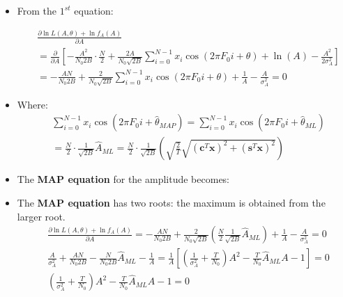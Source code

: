\begin{itemize}
\item From the \(1^{st}\) equation:

\begin{align*}
& \frac{\partial \ln L(A, \theta) + \ln f_A(A)}{\partial A} \\[5pt]
&= \frac{\partial}{\partial A} \left[ - \frac{A^2}{N_0 2B} \cdot \frac{N}{2} + \frac{2A}{N_0 \sqrt{2B}} \sum_{i=0}^{N-1} x_i \cos(2\pi F_0 i + \theta) + \ln(A) - \frac{A^2}{2\sigma_A^2} \right] \\[5pt]
&= - \frac{AN}{N_0 2B} + \frac{2}{N_0 \sqrt{2B}} \sum_{i=0}^{N-1} x_i \cos(2\pi F_0 i + \theta) + \frac{1}{A} - \frac{A}{\sigma_A^2} = 0
\end{align*}
\item Where:
\begin{align*}
&\sum_{i=0}^{N-1} x_i \cos \left( 2\pi F_0 i + \hat{\theta}_{MAP} \right) = \sum_{i=0}^{N-1} x_i \cos \left( 2\pi F_0 i + \hat{\theta}_{ML} \right) \\[5pt]
&= \frac{N}{2} \cdot \frac{1}{\sqrt{2B}} \hat{A}_{ML} = \frac{N}{2} \cdot \frac{1}{\sqrt{2B}} \left( \sqrt{\frac{2}{T}} \sqrt{(\mathbf{c}^T \mathbf{x})^2 + (\mathbf{s}^T \mathbf{x})^2} \right)
\end{align*}  
\item The \textbf{MAP equation} for the amplitude becomes:


\item The \textbf{MAP equation} has two roots: the maximum is obtained from the larger root.
\begin{align*}
&\frac{\partial \ln L(A, \theta) + \ln f_A(A)}{\partial A} = - \frac{AN}{N_0 2B} + \frac{2}{N_0 \sqrt{2B}} \left( \frac{N}{2} \frac{1}{\sqrt{2B}} \hat{A}_{ML} \right) + \frac{1}{A} - \frac{A}{\sigma_A^2} = 0 \\[5pt]
&\frac{A}{\sigma_A^2} + \frac{AN}{N_0 2B} - \frac{N}{N_0 2B} \hat{A}_{ML} - \frac{1}{A} = \frac{1}{A} \left[ \left( \frac{1}{\sigma_A^2} + \frac{T}{N_0} \right) A^2 - \frac{T}{N_0} \hat{A}_{ML} A - 1 \right] = 0 \\[5pt]
&\left( \frac{1}{\sigma_A^2} + \frac{T}{N_0} \right) A^2 - \frac{T}{N_0} \hat{A}_{ML} A - 1 = 0
\end{align*}


\end{itemize}

